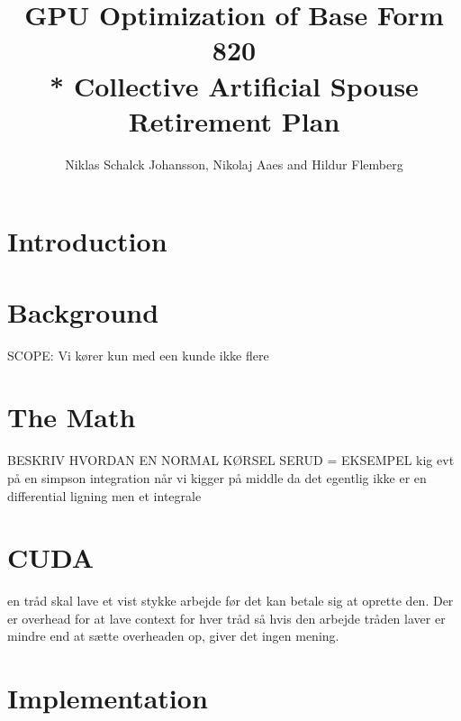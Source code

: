 \documentclass[oribibl]{llncs}
\title{GPU Optimization of Base Form 820 \\* Collective Artificial Spouse Retirement Plan}
\author{Niklas Schalck Johansson, Nikolaj Aaes and Hildur Flemberg\\
\email{\{nsjo, niaa, hufl\}@itu.dk}}
\institute{IT University of Copenhagen}
\begin{document}
	\maketitle
	
	
	\begin{abstract}
		
		\label{abstract}
	\end{abstract}

	
	\section{Introduction}
	
	
	\label{introduction}
		
	\section{Background}
	SCOPE: Vi kører kun med een kunde ikke flere
		
	
	\label{background}
		
	\section{The Math}
		
	
	\label{themath}
	
	BESKRIV HVORDAN EN NORMAL KØRSEL SERUD = EKSEMPEL
	kig evt på en simpson integration når vi kigger på middle da det egentlig ikke er en differential ligning men et integrale
		
	\section{CUDA}
en tråd skal lave et vist stykke arbejde før det kan betale sig at oprette den. Der er overhead for at lave context for hver tråd så hvis den arbejde tråden laver er mindre end at sætte overheaden op, giver det ingen mening.

	
	\label{cuda}
		
	\section{Implementation}
		
\end{document}
